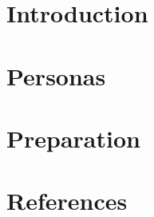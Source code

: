 % 

\section[Intro]{Introduction}


% 

\section[Personas]{Personas}
% 


\section[Prep]{Preparation}


% 

\section[Refs]{References}

